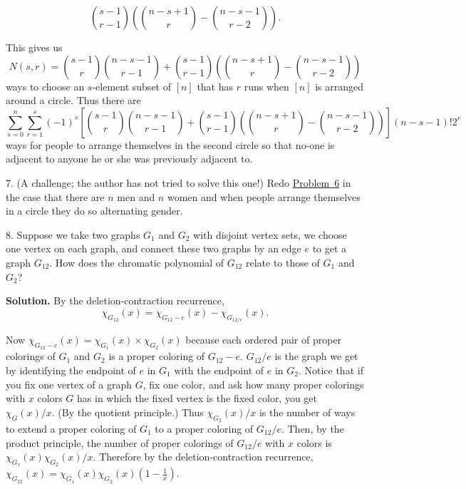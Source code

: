 \documentclass[10pt,]{book}
\theoremstyle{plain}
\theoremstyle{definition}
\theoremstyle{definition}
\numberwithin{equation}{chapter}
\begin{document}
\begin{exerciselist}
\begin{equation*}
\binom{s-1}{r-1}\left(\binom{n-s+1}{r}- \binom{n-s-1}{r-2}\right).
\end{equation*}
%
\par
This gives us%
\begin{equation*}
N(s,r) =\binom{s-1}{r}\binom{n-s-1}{r-1}+\binom{s-1}{r-1}\left(\binom{n-s+1}{r}- \binom{n-s-1}{r-2}\right)
\end{equation*}
ways to choose an \(s\)-element subset of \([n]\) that has \(r\) runs when \([n]\) is arranged around a circle. Thus there are%
\begin{equation*}
\sum\limits_{s=0}^n\sum\limits_{r=1}^{s}(-1)^s\left[\binom{s-1}{r}\binom{n-s-1}{r-1}+\binom{s-1}{r-1}\left(\binom{n-s+1}{r}- \binom{n-s-1}{r-2}\right)\right](n-s-1)!2^r
\end{equation*}
ways for people to arrange themselves in the second circle so that no-one is adjacent to anyone he or she was previously adjacent to.%
\item[7.]\hypertarget{exercise-52}{}(A challenge; the author has not tried to solve this one!) Redo \hyperlink{Hora}{Problem~6} in the case that there are \(n\) men and \(n\) women and when people arrange themselves in a circle they do so alternating gender.%
\par\smallskip
\item[8.]\hypertarget{exercise-53}{}Suppose we take two graphs \(G_1\) and \(G_2\) with disjoint vertex sets, we choose one vertex on each graph, and connect these two graphs by an edge \(e\) to get a graph \(G_{12}\). How does the chromatic polynomial of \(G_{12}\) relate to those of \(G_1\) and \(G_2\)?%
\par\smallskip
\par\smallskip
\noindent\textbf{Solution.}\hypertarget{solution-409}{}\quad
By the deletion-contraction recurrence,%
\begin{equation*}
\chi_{G_{12}}(x) =
\chi_{G_{12}-e}(x)-\chi_{G_{12/e}}(x).
\end{equation*}
%
\par
Now \(\chi_{G_{12}-e}(x)=\chi_{G_1}(x)\times \chi_{G_2}(x)\) because each ordered pair of proper colorings of \(G_1\) and \(G_2\) is a proper coloring of \(G_{12}-e\). \(G_{12}/e\) is the graph we get by identifying the endpoint of \(e\) in \(G_1\) with the endpoint of \(e\) in \(G_2\). Notice that if you fix one vertex of a graph \(G\), fix one color, and ask how many proper colorings with \(x\) colors \(G\) has in which the fixed vertex is the fixed color, you get \(\chi_G(x)/x\).  (By the quotient principle.) Thus \(\chi_{G_2}(x)/x\) is the number of ways to extend a proper coloring of \(G_1\) to a proper coloring of \(G_{12}/e\). Then, by the product principle, the number of proper colorings of \(G_{12}/e\) with \(x\) colors is \(\chi_{G_1}(x)\chi_{G_2}(x)/x\). Therefore by the deletion-contraction recurrence, \(\chi_{G_{12}}(x) = \chi_{G_1}(x)\chi_{G_2}(x)(1-\frac{1}{x})\).%
\end{exerciselist}
\typeout{************************************************}
\typeout{************************************************}
\end{document}
